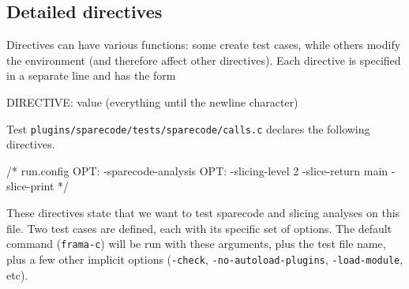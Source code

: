 \subsection{Detailed directives}\label{ptests:directives}

Directives can have various functions: some create test cases, while others
modify the environment (and therefore affect other directives).
Each directive is specified in a separate line and has the form
\begin{listing-nonumber}
DIRECTIVE: value (everything until the newline character)
\end{listing-nonumber}

\begin{example}
  Test \texttt{plugins/sparecode/tests/sparecode/calls.c} declares the
  following directives.
\begin{listing-nonumber}
/* run.config
   OPT: -sparecode-analysis
   OPT: -slicing-level 2 -slice-return main -slice-print
*/
\end{listing-nonumber}
These directives state that we want to test sparecode and slicing analyses on
this file. Two test cases are defined, each with its specific set of options.
The default command (\texttt{frama-c}) will be run with these arguments, plus
the test file name, plus a few other implicit options (\verb|-check|,
\verb|-no-autoload-plugins|, \verb|-load-module|, etc).
\end{example}

